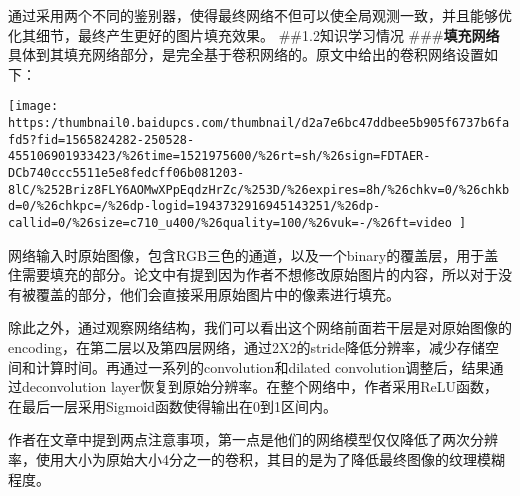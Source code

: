 \documentclass{article}
\begin{document}
通过采用两个不同的鉴别器，使得最终网络不但可以使全局观测一致，并且能够优化其细节，最终产生更好的图片填充效果。
\#\#1.2知识学习情况
\#\#\#\textbf{填充网络}
具体到其填充网络部分，是完全基于卷积网络的。原文中给出的卷积网络设置如下：%

\texttt{[image: https:/thumbnail0.baidupcs.com/thumbnail/d2a7e6bc47ddbee5b905f6737b6fafd5?fid=1565824282-250528-455106901933423/\%26time=1521975600/\%26rt=sh/\%26sign=FDTAER-DCb740ccc5511e5e8fedcff06b081203-8lC/\%252Briz8FLY6AOMwXPpEqdzHrZc/\%253D/\%26expires=8h/\%26chkv=0/\%26chkbd=0/\%26chkpc=/\%26dp-logid=1943732916945143251/\%26dp-callid=0/\%26size=c710\_u400/\%26quality=100/\%26vuk=-/\%26ft=video
]}{}%

网络输入时原始图像，包含RGB三色的通道，以及一个binary的覆盖层，用于盖住需要填充的部分。论文中有提到因为作者不想修改原始图片的内容，所以对于没有被覆盖的部分，他们会直接采用原始图片中的像素进行填充。%

除此之外，通过观察网络结构，我们可以看出这个网络前面若干层是对原始图像的encoding，在第二层以及第四层网络，通过2X2的stride降低分辨率，减少存储空间和计算时间。再通过一系列的convolution和dilated convolution调整后，结果通过deconvolution layer恢复到原始分辨率。在整个网络中，作者采用ReLU函数，在最后一层采用Sigmoid函数使得输出在0到1区间内。%

作者在文章中提到两点注意事项，第一点是他们的网络模型仅仅降低了两次分辨率，使用大小为原始大小4分之一的卷积，其目的是为了降低最终图像的纹理模糊程度。%
\end{document}
